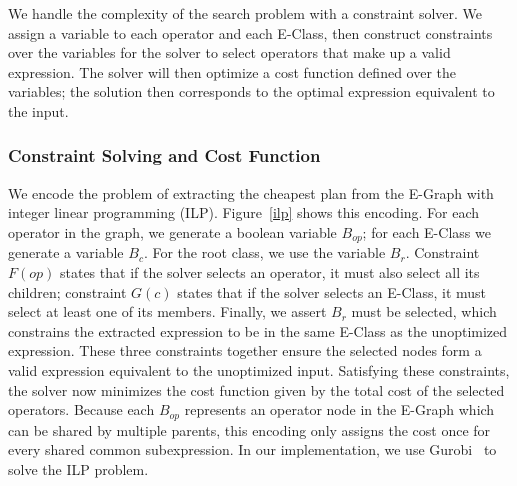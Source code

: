 We handle the complexity of the search problem with a constraint
solver. We assign a variable to each operator and each E-Class, then construct
constraints over the variables for the solver to select operators that make up a
valid expression. The solver will then optimize a cost function defined over the
variables; the solution then corresponds to the optimal expression equivalent to
the input.  

\subsubsection*{Constraint Solving and Cost Function}
We encode the problem of extracting the cheapest plan from the E-Graph with
integer linear programming (ILP). Figure~\ref{ilp} shows this encoding. For each
operator in the graph, we generate a boolean variable $B_{op}$; for each E-Class
we generate a variable $B_c$. For the root class, we use the variable $B_r$.
Constraint $F(op)$ states that if the solver selects an operator, it must also
select all its children; constraint $G(c)$ states that if the solver selects an
E-Class, it must select at least one of its members. Finally, we assert $B_r$ must 
be selected, which constrains the extracted expression
to be in the same E-Class as the unoptimized expression. These three constraints together
ensure the
selected nodes form a valid expression equivalent to the unoptimized input.
Satisfying these constraints, the solver now minimizes the cost function given
by the total cost of the selected operators. Because each $B_{op}$ represents an
operator node in the E-Graph which can be shared by multiple parents, this
encoding only assigns the cost once for every shared common subexpression. In
our implementation, we use Gurobi~\cite{gurobi} to solve the ILP problem.

